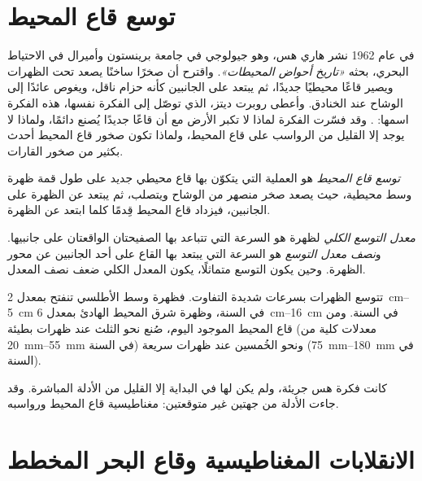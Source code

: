 \section{توسع قاع المحيط}

\begin{history}
في عام 1962 نشر هاري هس، وهو جيولوجي في جامعة برينستون وأميرال في
الاحتياط البحري، بحثه \emph{«تاريخ أحواض المحيطات»}.
واقترح أن صخرًا ساخنًا يصعد تحت الظهرات ويصير قاعًا محيطيًا جديدًا،
ثم يبتعد على الجانبين كأنه حزام ناقل، ويغوص عائدًا إلى
الوشاح عند الخنادق. وأعطى روبرت ديتز، الذي توصّل إلى الفكرة نفسها، هذه الفكرة
اسمها: . وقد فسّرت الفكرة لماذا لا تكبر الأرض
مع أن قاعًا جديدًا يُصنع دائمًا، ولماذا لا يوجد إلا القليل من الرواسب على
قاع المحيط، ولماذا تكون صخور قاع المحيط أحدث بكثير من صخور
القارات.
\end{history}

\begin{definition}\label{def:g11:drift-to-spreading:spreading}
\emph{توسع قاع المحيط} هو العملية التي يتكوّن بها
قاع محيطي جديد على طول قمة ظهرة وسط محيطية، حيث يصعد صخر منصهر
من الوشاح ويتصلب، ثم يبتعد عن الظهرة على
الجانبين، فيزداد قاع المحيط قِدمًا كلما ابتعد عن الظهرة.
\end{definition}

\begin{definition}\label{def:g11:drift-to-spreading:spreading-rate}
\emph{معدل التوسع الكلي} لظهرة هو السرعة التي
تتباعد بها الصفيحتان الواقعتان على جانبيها. و\emph{نصف معدل
التوسع} هو السرعة التي يبتعد بها القاع على أحد الجانبين عن محور
الظهرة. وحين يكون التوسع متماثلًا، يكون المعدل الكلي ضعف نصف المعدل.
\end{definition}

تتوسع الظهرات بسرعات شديدة التفاوت. فظهرة وسط الأطلسي تنفتح بمعدل
\qtyrange{2}{5}{cm} في السنة، وظهرة شرق المحيط الهادئ بمعدل \qtyrange{6}{16}{cm} في
السنة. ومن قاع المحيط الموجود اليوم، صُنع نحو الثلث عند ظهرات
بطيئة (معدلات كلية من \qtyrange{20}{55}{mm} في السنة) ونحو الخُمسين عند
ظهرات سريعة (\qtyrange{75}{180}{mm} في السنة).

كانت فكرة هس جريئة، ولم يكن لها في البداية إلا القليل من الأدلة المباشرة. وقد جاءت الأدلة
من جهتين غير متوقعتين: مغناطيسية قاع المحيط
ورواسبه.

\section{الانقلابات المغناطيسية وقاع البحر المخطط}

